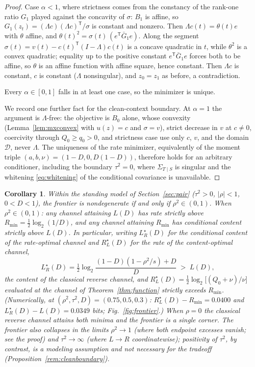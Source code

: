 \documentclass[11pt,onecolumn]{IEEEtran}
\newtheorem{corollary}[theorem]{Corollary}
\newcommand{\LRs}{L_{R}^{\star}}
\newcommand{\RLs}{R_{L}^{\star}}
\begin{document}
\begin{proof}
Case $\alpha<1$, where strictness comes from the constancy of the
rank-one ratio $G_1$ played against the concavity of $\sigma$: $B_1$
is affine, so
$G_1(z_t)=(\Lambda c)(\Lambda c)^{\mathsf T}/\sigma$ is constant and
nonzero. Then $\Lambda c(t)=\theta(t)e$ with $\theta$ affine, and
$\theta(t)^2=\sigma(t)\,(e^{\mathsf T}\bar G_1e)$. Along the segment
$\sigma(t)=v(t)-c(t)^{\mathsf T}(I-\Lambda)c(t)$ is a concave
quadratic in $t$, while $\theta^2$ is a convex quadratic; equality up
to the positive constant $e^{\mathsf T}\bar G_1e$ forces both to be
affine, so $\theta$ is an affine function with affine square, hence
constant. Then $\Lambda c$ is constant, $c$ is constant ($\Lambda$
nonsingular), and $z_0=z_1$ as before, a contradiction.

Every $\alpha\in[0,1]$ falls in at least one case, so the minimizer is
unique.

We record one further fact for the clean-context boundary. At
$\alpha=1$ the argument is $\Lambda$-free: the objective is $B_0$
alone, whose convexity (Lemma~\ref{lem:mxconvex} with $u(z)=c$ and
$\sigma=v$), strict decrease in $v$ at $c\ne0$, coercivity through
$Q_0\ge q_0>0$, and strictness case use only $c$, $v$, and the domain
$\mathcal D$, never $\Lambda$. The uniqueness of the rate minimizer,
equivalently of the moment triple $(a,b,\nu)=(1-D,0,D(1-D))$, therefore
holds for an arbitrary conditioner, including the boundary $\tau^2=0$,
where $\Sigma_{T\mid S}$ is singular and the whitening
\eqref{eq:whitening} of the conditional covariance is unavailable.
\end{proof}

\begin{corollary}
\label{cor:misalign}
Within the standing model of Section~\ref{sec:pair} ($\tau^2>0$,
$|\rho|<1$, $0<D<1$), the frontier is nondegenerate if and only if
$\rho^2\in(0,1)$. When $\rho^2\in(0,1)$: any channel attaining $L(D)$
has rate strictly above $R_{\min}=\tfrac12\log_2(1/D)$, and any
channel attaining $R_{\min}$ has conditional content strictly above
$L(D)$. In particular, writing $\LRs(D)$ for the conditional content of
the rate-optimal channel and $\RLs(D)$ for the rate of the
content-optimal channel,
\[
\LRs(D)=\tfrac12\log_2\frac{(1-D)(1-\rho^2/s)+D}{D}\;>\;L(D),
\]
the content of the classical reverse channel, and
$\RLs(D)=\tfrac12\log_2\bigl[(Q_0+\nu)/\nu\bigr]$ evaluated at the channel of
Theorem~\ref{thm:function} strictly exceeds $R_{\min}$. (Numerically,
at $(\rho^2,\tau^2,D)=(0.75,0.5,0.3)$: $\RLs(D)-R_{\min}=0.0400$ and
$\LRs(D)-L(D)=0.0349$ bits; Fig.~\ref{fig:frontier}.) When $\rho=0$ the classical reverse channel
attains both minima and the frontier is a single corner. The frontier
also collapses in the limits $\rho^2\to1$ (where both endpoint
excesses vanish; see the proof) and $\tau^2\to\infty$ (where
$L\to R$ coordinatewise); positivity of $\tau^2$, by contrast, is a
modeling assumption and not necessary for the tradeoff
(Proposition~\ref{rem:cleanboundary}).
\end{corollary}
\end{document}

